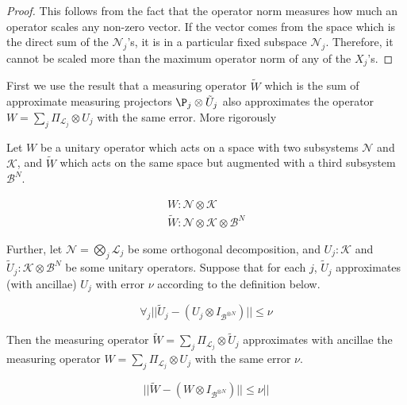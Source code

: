 \begin{proof}
This follows from the fact that the operator norm measures how much
an operator scales any non-zero vector. If the vector comes from the
space which is the direct sum of the $\mathcal{N}_j$'s, it is in a
particular fixed subspace $\mathcal{N}_j$. Therefore, it cannot be scaled
more than the maximum operator norm of any of the $X_j$'s.
\end{proof}

First we use the result that a measuring operator $\tilde{W}$
which is the sum of
approximate measuring projectors $\P_j \otimes \tilde{U}_j$
also approximates the operator $W = \sum_{j} \Pi_{\mathcal{L}_j} \otimes U_j$
with the same error. More rigorously

\begin{lemma}
\label{lemma:error-sum}
Let $W$ be a unitary operator which acts on a space with two subsystems
$\mathcal{N}$ and $\mathcal{K}$, and $\tilde{W}$ which acts on the same space
but augmented with a third subsystem $\mathcal{B}^N$.

\begin{eqnarray}
W : \mathcal{N} \otimes \mathcal{K}\\
\tilde{W} : \mathcal{N} \otimes \mathcal{K} \otimes \mathcal{B}^N
\end{eqnarray}

Further, let $\mathcal{N} = \bigotimes_{j} \mathcal{L}_j$
be some orthogonal decomposition, and $U_j : \mathcal{K}$ and 
$\tilde{U}_j : \mathcal{K} \otimes \mathcal{B}^N$ be some unitary operators.
Suppose that for each $j$,
$\tilde{U}_j$ approximates (with ancillae) $U_j$ with error $\nu$
according to the
definition below.

\begin{equation}
\forall_j || \tilde{U}_j - (U_j \otimes I_{\mathcal{B}^{\otimes N}}) || \le \nu
\end{equation}

Then the measuring operator
$\tilde{W} = \sum_j \Pi_{\mathcal{L}_j} \otimes \tilde{U}_j$ approximates
with ancillae the measuring operator
$W = \sum_j \Pi_{\mathcal{L}_j} \otimes U_j$ with the same error $\nu$.

\begin{equation}
|| \tilde{W} - (W \otimes I_{\mathcal{B}^{\otimes N}}) || \le \nu ||
\end{equation}

\end{lemma}

